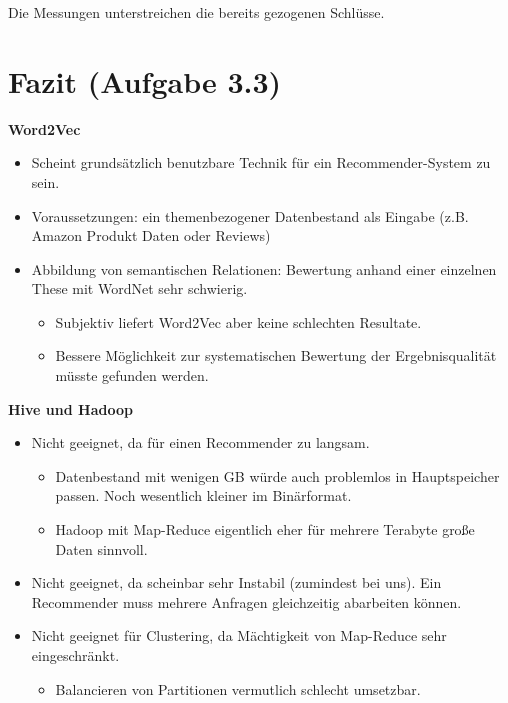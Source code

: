 \documentclass[a4paper, 11pt]{scrartcl}
\begin{document}
Die Messungen unterstreichen die bereits gezogenen Schlüsse.

\section{Fazit (Aufgabe 3.3)}

\textbf{Word2Vec}
\begin{itemize}
\item{Scheint grundsätzlich benutzbare Technik für ein Recommender-System zu sein.}
\item{Voraussetzungen: ein themenbezogener Datenbestand als Eingabe (z.B. Amazon Produkt Daten oder Reviews)}
\item{Abbildung von semantischen Relationen: Bewertung anhand einer einzelnen These mit WordNet sehr schwierig.}
\begin{itemize}
\item{Subjektiv liefert Word2Vec aber keine schlechten Resultate.}
\item{Bessere Möglichkeit zur systematischen Bewertung der Ergebnisqualität müsste gefunden werden.}
\end{itemize}
\end{itemize}

\textbf{Hive und Hadoop}
\begin{itemize}
\item{Nicht geeignet, da für einen Recommender zu langsam.}
\begin{itemize}
\item{Datenbestand mit wenigen GB würde auch problemlos in Hauptspeicher passen. Noch wesentlich kleiner im Binärformat.}
\item{Hadoop mit Map-Reduce eigentlich eher für mehrere Terabyte große Daten sinnvoll.}
\end{itemize}
\item{Nicht geeignet, da scheinbar sehr Instabil (zumindest bei uns). Ein Recommender muss mehrere Anfragen gleichzeitig abarbeiten können.}
\item{Nicht geeignet für Clustering, da Mächtigkeit von Map-Reduce sehr eingeschränkt.}
\begin{itemize}
\item{Balancieren von Partitionen vermutlich schlecht umsetzbar.}
\end{itemize}
\end{itemize}
\end{document}
